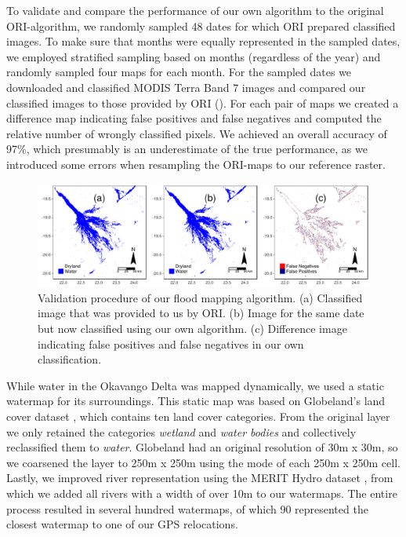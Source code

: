 \documentclass[abstract=off,10pt,a4paper,bibliography=totocnumbered]{article}
\begin{document}
To validate and compare the performance of our own algorithm to the original
ORI-algorithm, we randomly sampled 48 dates for which ORI prepared classified
images. To make sure that months were equally represented in the sampled dates,
we employed stratified sampling based on months (regardless of the year) and
randomly sampled four maps for each month. For the sampled dates we downloaded
and classified MODIS Terra Band 7 images and compared our classified images to
those provided by ORI (). For each pair of maps we
created a difference map indicating false positives and false negatives and
computed the relative number of wrongly classified pixels. We achieved an
overall accuracy of 97\%, which presumably is an underestimate of the true
performance, as we introduced some errors when resampling the ORI-maps to our
reference raster.

\begin{figure}[hbtp]
  \begin{center}
    \includegraphics[width = \textwidth]{99_FloodmappingValidation.pdf}
    \caption{Validation procedure of our flood mapping algorithm. (a) Classified
    image that was provided to us by ORI. (b) Image for the same date but now
    classified using our own algorithm. (c) Difference image indicating false
    positives and false negatives in our own classification.}
    \label{FloodmappingValidation}
  \end{center}
\end{figure}

\noindent While water in the Okavango Delta was mapped dynamically, we used a
static watermap for its surroundings. This static map was based on Globeland's
land cover dataset \citep{Chen.2015}, which contains ten land cover categories.
From the original layer we only retained the categories \textit{wetland} and
\textit{water bodies} and collectively reclassified them to \textit{water}.
Globeland had an original resolution of 30m x 30m, so we coarsened the layer to
250m x 250m using the mode of each 250m x 250m cell. Lastly, we improved river
representation using the MERIT Hydro dataset \citep{Yamazaki.2019}, from which
we added all rivers with a width of over 10m to our watermaps. The entire
process resulted in several hundred watermaps, of which 90 represented the
closest watermap to one of our GPS relocations.
\end{document}

